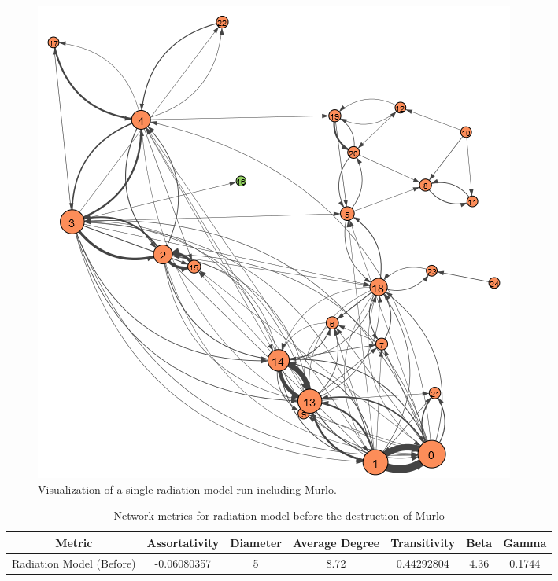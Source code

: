 \documentclass[12pt,a4paper]{thesis}
\begin{document}
\begin{figure}[H]
\centering
\includegraphics[width=0.9\linewidth]{./BeforeViz/radModel}
\caption{Visualization of a single radiation model run including Murlo.}
\label{fig:radModelBefore}
\end{figure}

\begin{table}[H]
\centering
\caption{Network metrics for radiation model before the destruction of Murlo}
\tiny
\begin{tabular}{|c|c|c|c|c|c|c|}
\hline Metric & Assortativity & Diameter & Average Degree & Transitivity & Beta & Gamma \\ 
\hline Radiation Model (Before) & -0.06080357 & 5 & 8.72 & 0.44292804 & 4.36 & 0.1744 \\ 
\hline 
\end{tabular} 
\label{tab:radNetBefore}
\end{table}
\end{document}

